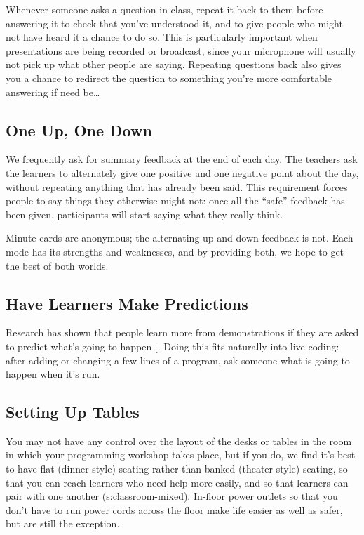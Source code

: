 Whenever someone asks a question in class, repeat it back to them before
answering it to check that you've understood it, and to give people who
might not have heard it a chance to do so. This is particularly
important when presentations are being recorded or broadcast, since your
microphone will usually not pick up what other people are saying.
Repeating questions back also gives you a chance to redirect the
question to something you're more comfortable answering if need
be\ldots{}

\subsection{One Up, One Down}\label{one-up-one-down}

We frequently ask for summary feedback at the end of each day. The
teachers ask the learners to alternately give one positive and one
negative point about the day, without repeating anything that has
already been said. This requirement forces people to say things they
otherwise might not: once all the ``safe'' feedback has been given,
participants will start saying what they really think.

Minute cards are anonymous; the alternating up-and-down feedback is not.
Each mode has its strengths and weaknesses, and by providing both, we
hope to get the best of both worlds.

\subsection{Have Learners Make Predictions}\label{have-learners-make-predictions}

Research has shown that people learn more from demonstrations if they
are asked to predict what's going to happen {[}\protect[\hyperlink{b:Mill2013}{Mill2013}]{]}. Doing
this fits naturally into live coding: after adding or changing a few
lines of a program, ask someone what is going to happen when it's run.

\subsection{Setting Up Tables}\label{setting-up-tables}

You may not have any control over the layout of the desks or tables in
the room in which your programming workshop takes place, but if you do,
we find it's best to have flat (dinner-style) seating rather than banked
(theater-style) seating, so that you can reach learners who need help
more easily, and so that learners can pair with one another
(\protect\hyperlink{SECTION}{s:classroom-mixed}). In-floor power outlets so that you
don't have to run power cords across the floor make life easier as
well as safer, but are still the exception.

